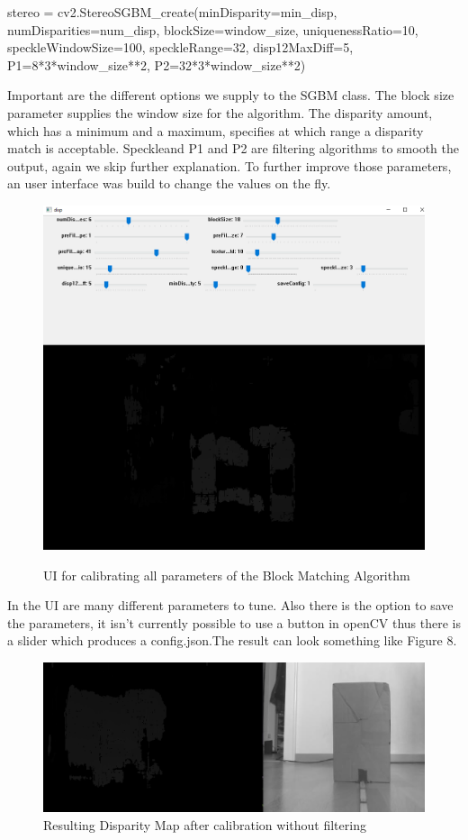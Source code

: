 \documentclass[journal,onecolumn]{IEEEtran}
\begin{document}
\begin{python}
stereo = cv2.StereoSGBM_create(minDisparity=min_disp,
			       numDisparities=num_disp,
			       blockSize=window_size,
			       uniquenessRatio=10,
			       speckleWindowSize=100,
			       speckleRange=32,
			       disp12MaxDiff=5,
			       P1=8*3*window_size**2,
			       P2=32*3*window_size**2)
\end{python}
Important are the different options we supply to the SGBM class. The block size parameter supplies the window size for the algorithm. The disparity amount, which has a minimum and a maximum, specifies at which range a disparity match is acceptable. Speckleand P1 and P2 are filtering algorithms to smooth the output\cite{stereoSGBM}, again we skip further explanation.
To further improve those parameters, an user interface was build to change the values on the fly.
\begin{figure}[H]
	\centering
	\includegraphics[scale=0.5]{calibrateUI.png}
	\label{UI}
	\captionsetup{justification=centering}
	\caption{UI for calibrating all parameters of the Block Matching Algorithm}
\end{figure}
\noindent
In the UI are many different parameters to tune. Also there is the option to save the parameters, it isn't currently possible to use a button in openCV thus there is a slider which produces a config.json.The result can look something like Figure 8.
\begin{figure}[H]
	\centering
	\includegraphics[scale=0.5]{disparityMap.png}
	\captionsetup{justification=centering}
	\caption{Resulting Disparity Map after calibration without filtering}
\end{figure}
\end{document}
